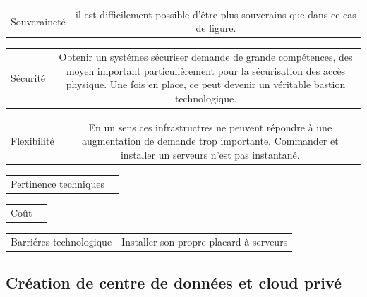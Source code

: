 \documentclass[11pt, a4paper ]{article}
\begin{document}
\begin{spacing}{1.5}
\begin{center}
	\begin{tabular}{| l | c | }
		Souveraineté & il est difficilement possible d'être plus souverains que dans ce cas de figure. \\
	\end{tabular}
	\begin{tabular}{| l | c | }
		Sécurité & Obtenir un systémes sécuriser demande de grande compétences, des moyen important particulièrement pour la sécurisation des accès physique. Une fois en place, ce peut devenir un véritable bastion technologique.\\
	\end{tabular}
	\begin{tabular}{| l | c | }
		Flexibilité & En un sens ces infrastructres ne peuvent répondre à une augmentation de demande trop importante. Commander et installer un serveurs n'est pas instantané. \\
	\end{tabular}
	\begin{tabular}{| l | c | }
		Pertinence techniques & \\
	\end{tabular}
	\begin{tabular}{| l | c | }
		Coût & \\
	\end{tabular}
	\begin{tabular}{| l | c | }
		Barriéres technologique & Installer son propre placard à serveurs \\
	\end{tabular}
\end{center}

			\subsection{Création de centre de données et cloud privé}







\end{spacing}
\end{document}
